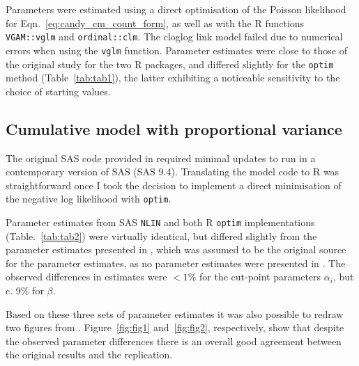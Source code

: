 Parameters were estimated using a direct optimisation of the Poisson likelihood for Eqn.~\ref{eq:candy_cm_count_form}, as well as with the R functions \verb+VGAM::vglm+ and \verb+ordinal::clm+. 
The cloglog link model failed due to numerical errors when using the \verb+vglm+ function. 
Parameter estimates were close to those of the original study for the two R packages, and differed slightly for the \verb+optim+ method (Table~\ref{tab:tab1}), the latter exhibiting a noticeable sensitivity to the choice of starting values.

\subsection{Cumulative model with proportional variance}



The original SAS code provided in \citep{dennis1986stochastic} required minimal updates to run in a contemporary version of SAS (SAS 9.4). 
Translating the model code to R was straightforward once I took the decision to implement a direct minimisation of the negative log likelihood with \verb+optim+.  

Parameter estimates from SAS \verb+NLIN+ and both R \verb+optim+ implementations (Table.~\ref{tab:tab2}) were virtually identical, but differed slightly from the parameter estimates presented in \citep{kemp1986stochastic}, which was assumed to be the original source for the parameter estimates, as no parameter estimates were presented in \citep{dennis1986stochastic}. 
The observed differences in estimates were $<1$\% for the cut-point parameters $\alpha_i$, but c. 9\% for $\beta$.

Based on these three sets of parameter estimates it was also possible to redraw two figures from \citep{dennis1986stochastic}. 
Figure~\ref{fig:fig1} and~\ref{fig:fig2}, respectively, show that despite the observed parameter differences  there is an overall good agreement between the original results and the replication.


